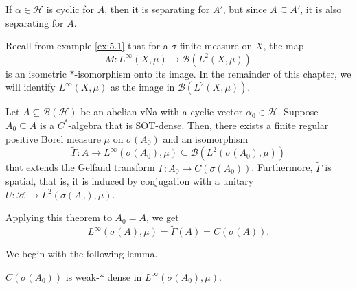 \begin{myproof}
  If $\alpha \in \mathcal{H}$ is cyclic for $A$, then it is separating for $A'$, 
  but since $A \subseteq A'$, it is also separating for $A$.
\end{myproof}

Recall from example \ref{ex:5.1} that for a $\sigma$-finite measure on $X$, the map 
$$M: L^\infty (X, \mu) \to \mathcal{B} (L^2 (X, \mu))$$
is an isometric $*$-isomorphism onto its image. In the remainder of this chapter, we will identify 
$L^\infty(X, \mu)$ as the image in $\mathcal{B} (L^2 (X, \mu))$.

\begin{theorem}\label{thm:6.2}
  Let $A \subseteq \mathcal{B}(\mathcal{H})$ be an abelian vNa with a cyclic vector $\alpha_0 \in \mathcal{H}$.
  Suppose $A_0 \subseteq A$ is a $C^*$-algebra that is SOT-dense. Then, there exists a finite regular positive Borel measure 
  $\mu$ on $\sigma(A_0)$ and an isomorphism $$\widetilde{\Gamma}: A \to L^\infty (\sigma (A_0), \mu) \subseteq \mathcal{B} (L^2 (\sigma(A_0), \mu))$$
  that extends the Gelfand transform $\Gamma: A_0 \to C(\sigma(A_0))$.
  Furthermore, $\widetilde{\Gamma}$ is spatial, that is, it is induced by conjugation with a unitary 
  $U: \mathcal{H} \to L^2 (\sigma(A_0), \mu)$.
\end{theorem}

\begin{remark}
  Applying this theorem to $A_0 = A$, we get 
  $$ L^{\infty} (\sigma(A), \mu) = \widetilde{\Gamma} (A) = C(\sigma(A)).$$
\end{remark}

We begin with the following lemma.

\begin{lemma}
  $C(\sigma(A_0))$ is weak-$*$ dense in $L^{\infty} (\sigma(A_0), \mu)$.
\end{lemma}

